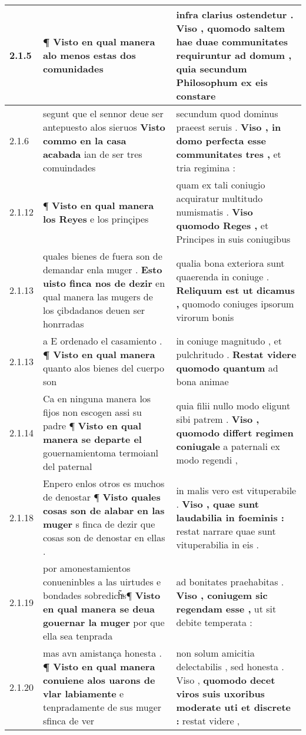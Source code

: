 \begin{tabular}{|p{1cm}|p{6.5cm}|p{6.5cm}|}
2.1.5 & ¶ \textbf{ Visto en qual manera } alo menos estas dos comunidades & infra clarius ostendetur . \textbf{ Viso , quomodo saltem hae duae communitates requiruntur ad domum , } quia secundum Philosophum ex eis constare \\\hline
2.1.6 & segunt que el sennor deue ser antepuesto alos sieruos \textbf{ Visto commo en la casa acabada } ian de ser tres comuindades & secundum quod dominus praeest seruis . \textbf{ Viso , in domo perfecta esse communitates tres , } et tria regimina : \\\hline
2.1.12 & ¶ \textbf{ Visto en qual manera los Reyes } e los prinçipes & quam ex tali coniugio acquiratur multitudo numismatis . \textbf{ Viso quomodo Reges , } et Principes in suis coniugibus \\\hline
2.1.13 & quales bienes de fuera son de demandar enla muger . \textbf{ Esto uisto finca nos de dezir } en qual manera las mugers de los çibdadanos deuen ser honrradas & qualia bona exteriora sunt quaerenda in coniuge . \textbf{ Reliquum est ut dicamus , } quomodo coniuges ipsorum virorum bonis \\\hline
2.1.13 & a E ordenado el casamiento . \textbf{ ¶ Visto en qual manera } quanto alos bienes del cuerpo son & in coniuge magnitudo , et pulchritudo . \textbf{ Restat videre quomodo quantum } ad bona animae \\\hline
2.1.14 & Ca en ninguna manera los fijos non escogen assi su padre ¶ \textbf{ Visto en qual manera se departe el } gouernamientoma termoianl del paternal & quia filii nullo modo eligunt sibi patrem . \textbf{ Viso , quomodo differt regimen coniugale } a paternali ex modo regendi , \\\hline
2.1.18 & Enpero enlos otros es muchos de denostar ¶ \textbf{ Visto quales cosas son de alabar en las muger } s finca de dezir que cosas son de denostar en ellas . & in malis vero est vituperabile . \textbf{ Viso , quae sunt laudabilia in foeminis : } restat narrare quae sunt vituperabilia in eis . \\\hline
2.1.19 & por amonestamientos conueninbles a las uirtudes e bondades sobredich̃ͣs¶ \textbf{ Visto en qual manera se deua gouernar la muger } por que ella sea tenprada & ad bonitates praehabitas . \textbf{ Viso , coniugem sic regendam esse , } ut sit debite temperata : \\\hline
2.1.20 & mas avn amistança honesta . \textbf{ ¶ Visto en qual manera conuiene alos uarons de vlar labiamente } e tenpradamente de sus muger sfinca de ver & non solum amicitia delectabilis , sed honesta . Viso , \textbf{ quomodo decet viros suis uxoribus moderate uti et discrete : } restat videre , \\\hline

\end{tabular}
